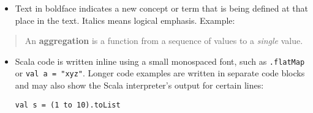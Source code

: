 \begin{itemize}
\item Text in boldface indicates a new concept or term that is being defined
at that place in the text. Italics means logical emphasis. Example:
\end{itemize}
\begin{quotation}
An \textbf{aggregation} is a function from a sequence
of values to a \emph{single} value.
\end{quotation}
\begin{itemize}
\item Scala code is written inline using a small monospaced font, such as
\lstinline!.flatMap! or \lstinline!val a = "xyz"!. Longer code examples
are written in separate code blocks and may also show the Scala interpreter's
output for certain lines:
\begin{lstlisting}[mathescape=true]
val s = (1 to 10).toList


\end{lstlisting}
\end{itemize}
